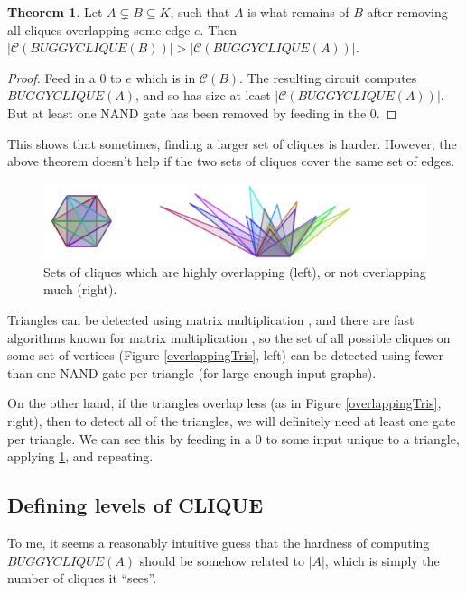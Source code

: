 \documentclass[12pt]{article}
\theoremstyle{definition}
\newtheorem{thm}{Theorem}[section]
\newcommand{\bigC}[0]{\mathcal{C}}
\begin{document}
\begin{thm}
\label{edgeZonking}
Let $A \subsetneq B \subseteq K$, such that $A$ is what remains
of $B$ after removing all cliques overlapping some edge $e$.
Then $|\bigC(BUGGYCLIQUE(B))| > |\bigC(BUGGYCLIQUE(A))|$.
\end{thm}
\begin{proof}
Feed in a 0 to $e$ which is in $\bigC(B)$. The resulting
circuit computes $BUGGYCLIQUE(A)$, and so has size
at least $|\bigC(BUGGYCLIQUE(A))|$. But at least one
NAND gate has been removed by feeding in the 0.
\end{proof}

This shows that sometimes, finding a larger set of cliques is
harder. However, the above theorem doesn't help if the two
sets of cliques cover the same set of edges.

\begin{figure}
\label{overlappingTris}
\centering
\includegraphics[width=1\textwidth]{R/tri1.pdf}
\caption{Sets of cliques which are highly overlapping (left),
or not overlapping much (right).}
\label{fig:overlappingTriangles}
\end{figure}

Triangles can be detected using matrix multiplication \cite{itai_finding_1977},
and there are fast algorithms known for matrix multiplication
\cite{strassen_gaussian_1969}
\cite{williams_multiplying_2012}, so the set of all possible
cliques on some set of vertices (Figure \ref{overlappingTris}, left)
 can be detected
using fewer than one NAND gate per triangle (for large enough input graphs).

On the other hand, if the triangles overlap less (as in
Figure \ref{overlappingTris}, right),
then to detect all of the triangles, we will definitely need at least one
gate per triangle. We can see this by feeding in a 0 to some input
unique to a triangle, applying \ref{edgeZonking}, and repeating.

\subsection{Defining levels of CLIQUE}

To me, it seems a reasonably intuitive guess that the hardness of
computing $BUGGYCLIQUE(A)$ should be somehow related to
$|A|$, which is simply the number of cliques it ``sees''.
\end{document}
